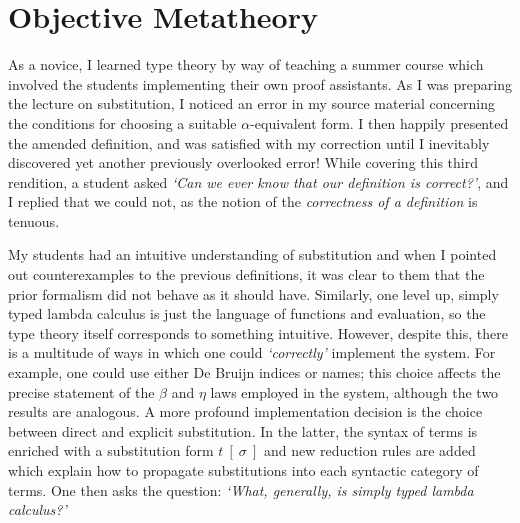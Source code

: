 \documentclass{article}[9pt]
\begin{document}
\section{Objective Metatheory}

\iffalse
Some code:
\begin{code}
{-# OPTIONS --without-K #-}

open import Agda.Builtin.String

-- A comment with some TeX ligatures:
-- --, ---, ?`, !`, `, ``, ', '', <<, >>.

Θ₁ : Set → Set
Θ₁ = λ A → A

a-name-with--hyphens : ∀ {A : Set} → A → A
a-name-with--hyphens ff--fl = ff--fl

ffi : String
ffi = "--"
\end{code}
Note that the code is indented.
\fi

As a novice, I learned type theory by way of teaching a summer course which
involved the students implementing their own proof assistants. As I was
preparing the lecture on substitution, I noticed an error in my source material
concerning the conditions for choosing a suitable $\alpha$-equivalent form. I
then happily presented the amended definition, and was satisfied with my
correction until I inevitably discovered yet another previously overlooked
error! While covering this third rendition, a student asked \textit{`Can we ever
know that our definition is correct?'}, and I replied that we could not, as the
notion of the \emph{correctness of a definition} is tenuous.

My students had an intuitive understanding of substitution and when I pointed
out counterexamples to the previous definitions, it was clear to them that the
prior formalism did not behave as it should have. Similarly, one level up,
simply typed lambda calculus is just the language of functions and evaluation,
so the type theory itself corresponds to something intuitive. However, despite
this, there is a multitude of ways in which one could \emph{`correctly'}
implement the system. For example, one could use either De Bruijn indices or
names; this choice affects the precise statement of the $\beta$ and $\eta$ laws
employed in the system, although the two results are analogous. A more profound
implementation decision is the choice between direct and explicit substitution.
In the latter, the syntax of terms is enriched with a substitution form
$t~[~\sigma~]$ and new reduction rules are added which explain how to propagate
substitutions into each syntactic category of terms. One then asks the question:
\emph{`What, generally, is simply typed lambda calculus?'}
\end{document}
